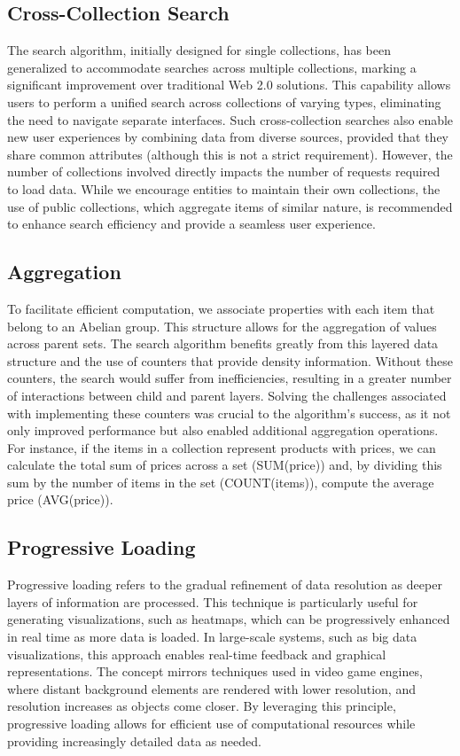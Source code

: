 \documentclass[11pt]{article}
\begin{document}
\subsection*{Cross-Collection Search}
The search algorithm, initially designed for single collections, has been generalized to accommodate searches across multiple collections, marking a significant improvement over traditional Web 2.0 solutions. This capability allows users to perform a unified search across collections of varying types, eliminating the need to navigate separate interfaces. Such cross-collection searches also enable new user experiences by combining data from diverse sources, provided that they share common attributes (although this is not a strict requirement). However, the number of collections involved directly impacts the number of requests required to load data. While we encourage entities to maintain their own collections, the use of public collections, which aggregate items of similar nature, is recommended to enhance search efficiency and provide a seamless user experience.

\subsection*{Aggregation}
To facilitate efficient computation, we associate properties with each item that belong to an Abelian group. This structure allows for the aggregation of values across parent sets. The search algorithm benefits greatly from this layered data structure and the use of counters that provide density information. Without these counters, the search would suffer from inefficiencies, resulting in a greater number of interactions between child and parent layers. Solving the challenges associated with implementing these counters was crucial to the algorithm’s success, as it not only improved performance but also enabled additional aggregation operations. For instance, if the items in a collection represent products with prices, we can calculate the total sum of prices across a set (SUM(price)) and, by dividing this sum by the number of items in the set (COUNT(items)), compute the average price (AVG(price)).

\subsection*{Progressive Loading}
Progressive loading refers to the gradual refinement of data resolution as deeper layers of information are processed. This technique is particularly useful for generating visualizations, such as heatmaps, which can be progressively enhanced in real time as more data is loaded. In large-scale systems, such as big data visualizations, this approach enables real-time feedback and graphical representations. The concept mirrors techniques used in video game engines, where distant background elements are rendered with lower resolution, and resolution increases as objects come closer. By leveraging this principle, progressive loading allows for efficient use of computational resources while providing increasingly detailed data as needed.
\end{document}
